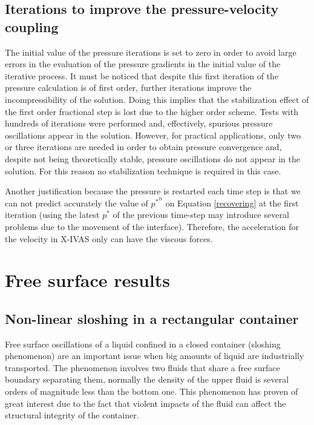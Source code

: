 \documentclass[a4paper,conference]{IEEEtran}
\begin{document}
  
\subsection{Iterations to improve the pressure-velocity coupling}

The initial value of the pressure iterations is set to zero in order to avoid large errors in the evaluation of the pressure gradients in the initial value of the iterative process. It must be noticed that despite this first iteration of the pressure calculation is
of first order, further iterations improve the incompressibility of the solution. Doing this implies that the stabilization effect of the first order fractional step is lost due to the higher order scheme. Tests with hundreds of iterations were performed and, effectively,
spurious pressure oscillations appear in the solution. However, for practical applications, only two or three iterations are needed in order to obtain pressure convergence and, despite not being theoretically stable, pressure oscillations do not appear in the solution. For this reason no stabilization technique is required in this case.

Another justification because the pressure is restarted each time step is that we can not predict accurately the value of ${p^*}^n$ on Equation \ref{recovering} at the first iteration (using the latest $p^*$ of the previous time-step may introduce several problems due to the movement of the interface). Therefore, the acceleration for the velocity in X-IVAS only can have the viscous forces.



\section{Free surface results}


\subsection{Non-linear sloshing in a rectangular container}%

Free surface oscillations of a liquid confined in a closed container (sloshing phenomenon) are an important issue when big amounts of liquid are industrially transported. The phenomenon involves two fluids that share a free surface boundary separating them, normally the density of the upper fluid is several orders of magnitude less than the bottom one. This phenomenon has proven of great interest due to the fact that violent impacts of the fluid can affect the structural integrity of the container.
\end{document}
